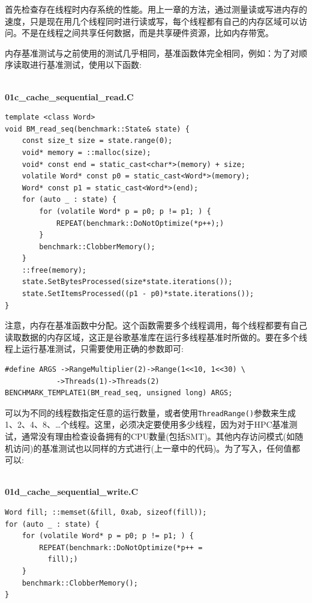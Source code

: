 首先检查存在线程时内存系统的性能。用上一章的方法，通过测量读或写进内存的速度，只是现在用几个线程同时进行读或写，每个线程都有自己的内存区域可以访问。不是在线程之间共享任何数据，而是共享硬件资源，比如内存带宽。

内存基准测试与之前使用的测试几乎相同，基准函数体完全相同，例如：为了对顺序读取进行基准测试，使用以下函数:

\hspace*{\fill} \\ %
\noindent
\textbf{01c\_cache\_sequential\_read.C}
\begin{lstlisting}[style=styleCXX]
template <class Word>
void BM_read_seq(benchmark::State& state) {
	const size_t size = state.range(0);
	void* memory = ::malloc(size);
	void* const end = static_cast<char*>(memory) + size;
	volatile Word* const p0 = static_cast<Word*>(memory);
	Word* const p1 = static_cast<Word*>(end);
	for (auto _ : state) {
		for (volatile Word* p = p0; p != p1; ) {
			REPEAT(benchmark::DoNotOptimize(*p++);)
		}
		benchmark::ClobberMemory();
	}
	::free(memory);
	state.SetBytesProcessed(size*state.iterations());
	state.SetItemsProcessed((p1 - p0)*state.iterations());
}
\end{lstlisting}

注意，内存在基准函数中分配。这个函数需要多个线程调用，每个线程都要有自己读取数据的内存区域，这正是谷歌基准库在运行多线程基准时所做的。要在多个线程上运行基准测试，只需要使用正确的参数即可:

\begin{lstlisting}[style=styleCXX]
#define ARGS ->RangeMultiplier(2)->Range(1<<10, 1<<30) \
			->Threads(1)->Threads(2)
BENCHMARK_TEMPLATE1(BM_read_seq, unsigned long) ARGS;
\end{lstlisting}

可以为不同的线程数指定任意的运行数量，或者使用\texttt{ThreadRange()}参数来生成1、2、4、8、…个线程。这里，必须决定要使用多少线程，因为对于HPC基准测试，通常没有理由检查设备拥有的CPU数量(包括SMT)。其他内存访问模式(如随机访问)的基准测试也以同样的方式进行(上一章中的代码)。为了写入，任何值都可以:

\hspace*{\fill} \\ %
\noindent
\textbf{01d\_cache\_sequential\_write.C}
\begin{lstlisting}[style=styleCXX]
Word fill; ::memset(&fill, 0xab, sizeof(fill));
for (auto _ : state) {
	for (volatile Word* p = p0; p != p1; ) {
		REPEAT(benchmark::DoNotOptimize(*p++ =
		  fill);)
	}
	benchmark::ClobberMemory();
}
\end{lstlisting}

